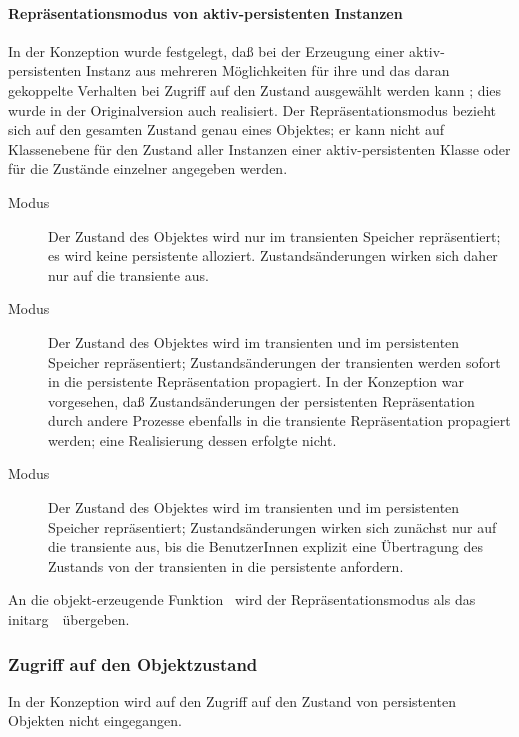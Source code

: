 \paragraph{Repr\"{a}sentationsmodus von aktiv-persistenten Instanzen}
%
In der Konzeption wurde festgelegt, da\ss{} bei der Erzeugung einer
aktiv-persistenten Instanz aus mehreren M\"{o}glichkeiten f\"{u}r ihre
\representationform{} und das daran gekoppelte Verhalten bei Zugriff
auf den Zustand ausgew\"{a}hlt werden kann
\cite[]{bib:ro87}; dies wurde in der Originalversion
auch realisiert. Der Repr\"{a}sentationsmodus bezieht sich
auf den gesamten Zustand genau eines Objektes; er kann nicht auf
Klassenebene f\"{u}r den Zustand aller Instanzen einer aktiv-persistenten
Klasse oder f\"{u}r die Zust\"{a}nde einzelner \Slt[s]\/ angegeben werden.
%
\begin{description}
%
\item[Modus ]
Der Zustand des Objektes wird nur im transienten Speicher
repr\"{a}sentiert; es wird keine persistente \representation{} alloziert.
Zustands\"{a}nderungen wirken sich daher nur auf die transiente
\representation{} aus.
%
\item[Modus ]
Der Zustand des Objektes wird im transienten und im persistenten
Speicher repr\"{a}sentiert; Zustands\"{a}nderungen der transienten
\representation{} werden sofort in die persistente Repr\"{a}sentation
propagiert. In der Konzeption war vorgesehen, da\ss{}
Zu\-stands\-\"{a}n\-de\-run\-gen der persistenten Re\-pr\"{a}\-sen\-ta\-tion
durch andere Prozesse ebenfalls in die transiente
Re\-pr\"{a}\-sen\-ta\-tion propagiert werden; eine Realisierung dessen
erfolgte nicht.
%
\item[Modus ]
Der Zustand des Objektes wird im transienten und im persistenten
Speicher repr\"{a}sentiert; Zustands\"{a}nderungen wirken sich zun\"{a}chst nur
auf die transiente \representation{} aus, bis die BenutzerInnen explizit
eine \"{U}bertragung des Zustands von der transienten in die persistente
\representation{} anfordern.
%
%
\end{description}
%
An die objekt-erzeugende Funktion \ wird der
Repr\"{a}sentationsmodus als das
%
{initarg}\ \ \"{u}bergeben.
%
\subsubsection{Zugriff auf den Objektzustand}
%
In der Konzeption wird auf den Zugriff auf den Zustand von
persistenten Objekten nicht eingegangen.
%
